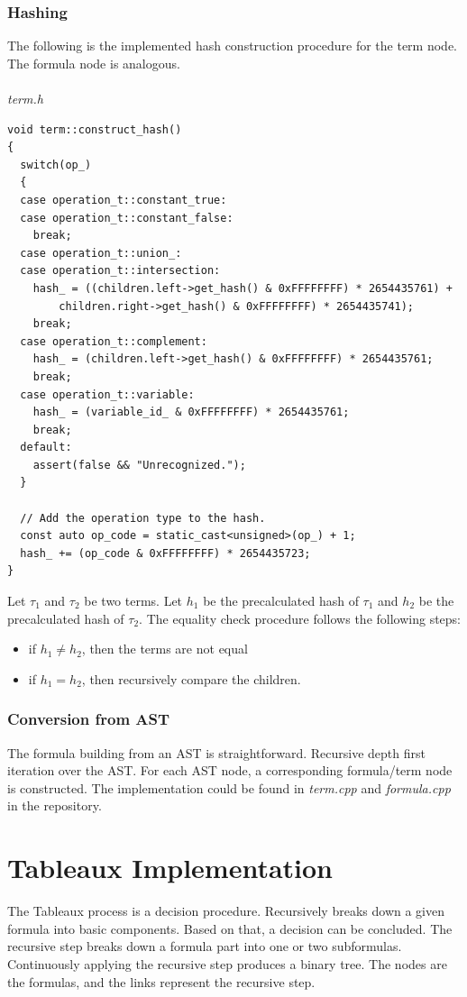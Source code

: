 \documentclass{article}
\begin{document}
	\subsubsection{Hashing}
	The following is the implemented hash construction procedure for the term node. The formula node is analogous.
	\\
	\\
\noindent
\textit{term.h}
\begin{lstlisting}
void term::construct_hash()
{
  switch(op_)
  {
  case operation_t::constant_true:
  case operation_t::constant_false:
    break;
  case operation_t::union_:
  case operation_t::intersection:
    hash_ = ((children.left->get_hash() & 0xFFFFFFFF) * 2654435761) +
        children.right->get_hash() & 0xFFFFFFFF) * 2654435741);
    break;
  case operation_t::complement:
    hash_ = (children.left->get_hash() & 0xFFFFFFFF) * 2654435761;
    break;
  case operation_t::variable:
    hash_ = (variable_id_ & 0xFFFFFFFF) * 2654435761;
    break;
  default:
    assert(false && "Unrecognized.");
  }

  // Add the operation type to the hash.
  const auto op_code = static_cast<unsigned>(op_) + 1;
  hash_ += (op_code & 0xFFFFFFFF) * 2654435723;
}
\end{lstlisting}

	Let $\tau_1$ and $\tau_2$ be two terms. Let $h_1$ be the precalculated hash of $\tau_1$ and $h_2$ be the precalculated hash of $\tau_2$.
	The equality check procedure follows the following steps:
	\begin{itemize}
		\item if $h_1 \neq h_2$, then the terms are not equal
		\item if $h_1 = h_2$, then recursively compare the children.
	\end{itemize}
	\noindent

	\newpage
	\subsubsection{Conversion from AST}
	The formula building from an AST is straightforward. Recursive depth first iteration over the AST. For each AST node, a corresponding formula/term node is constructed. The implementation could be found in \textit{term.cpp} and \textit{formula.cpp} in the repository.

	\newpage
	\section{Tableaux Implementation}
	The Tableaux process is a decision procedure. Recursively breaks down a given formula into basic components. Based on that, a decision can be concluded. The recursive step breaks down a formula part into one or two subformulas. Continuously applying the recursive step produces a binary tree. The nodes are the formulas, and the links represent the recursive step.
\end{document}
